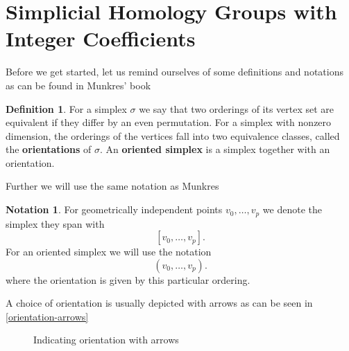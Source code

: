 \documentclass[toc=bib, headinclude]{scrartcl}
\theoremstyle{plain}
\theoremstyle{definition}
\newtheorem	{definition}[theorem]{Definition}
\newtheorem{notation}[theorem]{Notation}
\theoremstyle{remark}
\newcommand{\SH}{Simplicial Homology}
\begin{document}
\section{\SH{} Groups with Integer Coefficients}\label{first-hom}

Before we get started, let us remind ourselves of some definitions and notations as can be found in Munkres' book \cite[p. 26f.]{mu}
\begin{definition}
	For a simplex $\sigma$ we say that two orderings of its vertex set are equivalent if they differ by an even permutation. For a simplex with nonzero dimension, the orderings of the vertices fall into two equivalence classes, called the \textbf{orientations} of $\sigma$. An \textbf{oriented simplex} is a simplex together with an orientation.
\end{definition}
Further we will use the same notation as Munkres \cite[p. 26]{mu}
\begin{notation}
	For geometrically independent points $v_0,\dots,v_p$ we denote the simplex they span with
	\[
	[v_0,\dots,v_p].
	\]
	For an oriented simplex we will use the notation
	\[
	(v_0,\dots,v_p).
	\]
	where the orientation is given by this particular ordering.
\end{notation}

A choice of orientation is usually depicted with arrows as can be seen in \autoref{orientation-arrows}

\begin{figure}
	\centering

\caption{Indicating orientation with arrows \cite[see][p.27]{mu}\label{orientation-arrows}}
\end{figure}
\end{document}

